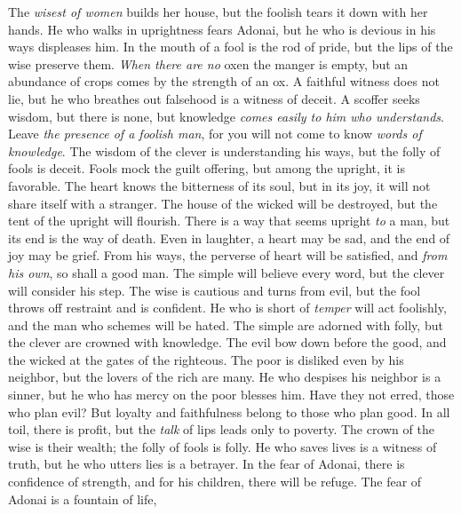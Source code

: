\begin{biblechapter} %
\verse The \textit{wisest of women} builds her house, 
but the foolish tears it down with her hands.
\verse He who walks in uprightness fears Adonai, 
but he who is devious in his ways displeases him.
\verse In the mouth of a fool is the rod of pride, 
but the lips of the wise preserve them.
\verse \textit{When there are no} oxen the manger is empty, 
but an abundance of crops comes by the strength of an ox.
\verse A faithful witness does not lie, 
but he who breathes out falsehood is a witness of deceit.
\verse A scoffer seeks wisdom, but there is none, 
but knowledge \textit{comes easily to him who understands}.
\verse Leave \textit{the presence of a foolish man}, 
for you will not come to know \textit{words of knowledge}.
\verse The wisdom of the clever is understanding his ways, 
but the folly of fools is deceit.
\verse Fools mock the guilt offering, 
but among the upright, it is favorable.
\verse The heart knows the bitterness of its soul, 
but in its joy, it will not share itself with a stranger.
\verse The house of the wicked will be destroyed, 
but the tent of the upright will flourish.
\verse There is a way that seems upright \textit{to} a man, 
but its end is the way of death.
\verse Even in laughter, a heart may be sad, 
and the end of joy may be grief.
\verse From his ways, the perverse of heart will be satisfied, 
and \textit{from his own}, so shall a good man.
\verse The simple will believe every word, 
but the clever will consider his step.
\verse The wise is cautious and turns from evil, 
but the fool throws off restraint and is confident.
\verse He who is short of \textit{temper} will act foolishly, 
and the man who schemes will be hated.
\verse The simple are adorned with folly, 
but the clever are crowned with knowledge.
\verse The evil bow down before the good, 
and the wicked at the gates of the righteous.
\verse The poor is disliked even by his neighbor, 
but the lovers of the rich are many.
\verse He who despises his neighbor is a sinner, 
but he who has mercy on the poor blesses him.
\verse Have they not erred, those who plan evil? 
But loyalty and faithfulness belong to those who plan good.
\verse In all toil, there is profit, 
but the \textit{talk} of lips leads only to poverty.
\verse The crown of the wise is their wealth; 
the folly of fools is folly.
\verse He who saves lives is a witness of truth, 
but he who utters lies is a betrayer.
\verse In the fear of Adonai, there is confidence of strength, 
and for his children, there will be refuge.
\verse The fear of Adonai is a fountain of life, 

\end{biblechapter}
